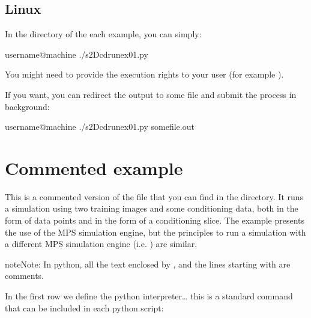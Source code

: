 \documentclass[letterpaper,10pt,english]{sphinxmanual}
\begin{document}
\subsection{Linux}
\label{\detokenize{examples:linux}}
In the directory of the each example, you can simply:

\begin{sphinxVerbatim}[commandchars=\\\{\}]
username@machine\PYGZdl{} ./s2Dcd\PYGZus{}run\PYGZhy{}ex01.py
\end{sphinxVerbatim}

You might need to provide the execution rights to your user
(for example  ).

If you want, you can redirect the output to some file and submit the process
in background:

\begin{sphinxVerbatim}[commandchars=\\\{\}]
username@machine\PYGZdl{} ./s2Dcd\PYGZus{}run\PYGZhy{}ex01.py \PYGZgt{} somefile.out \PYGZam{}
\end{sphinxVerbatim}


\section{Commented example}
\label{\detokenize{examples:commented-example}}
This is a commented version of the file  that you
can find in the 
directory.  It runs a simulation using two training images and some
conditioning data, both in the form of data points and in the form of
a conditioning slice.  The example presents the use of the 
MPS simulation engine, but the principles to run a simulation with a
different MPS simulation engine (i.e. ) are similar.

\begin{sphinxadmonition}{note}{Note:}
In python, all the text enclosed by \sphinxcode{\sphinxupquote{\textquotesingle{}\textquotesingle{}\textquotesingle{}}},  and the lines
starting with \sphinxcode{\sphinxupquote{\#}} are comments.
\end{sphinxadmonition}

In the first row we define the python interpreter… this is a
standard command that can be included in each python script:
\end{document}
